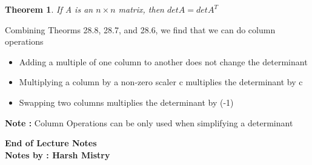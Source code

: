 \documentclass{article}
\newcounter{lecnum}
\newtheorem{theorem}{Theorem}[lecnum]
\begin{document}
\begin{theorem}
If A is an \(n \times n\) matrix, then \(det A = det A^T\)
\end{theorem}

Combining Theorms 28.8, 28.7, and 28.6, we find that we can do column operations 
\begin{itemize}
\item Adding a multiple of one column to another does not change the determinant 
\item Multiplying a column by a non-zero scaler c multiplies the determinant by c
\item Swapping two columns multiplies the determinant by (-1)
\end{itemize}

\textbf{Note :} Column Operations can be only used when simplifying a determinant

\begin{center}
\textbf{End of Lecture Notes}\\
\textbf{Notes by : Harsh Mistry}
\end{center}
\end{document}
